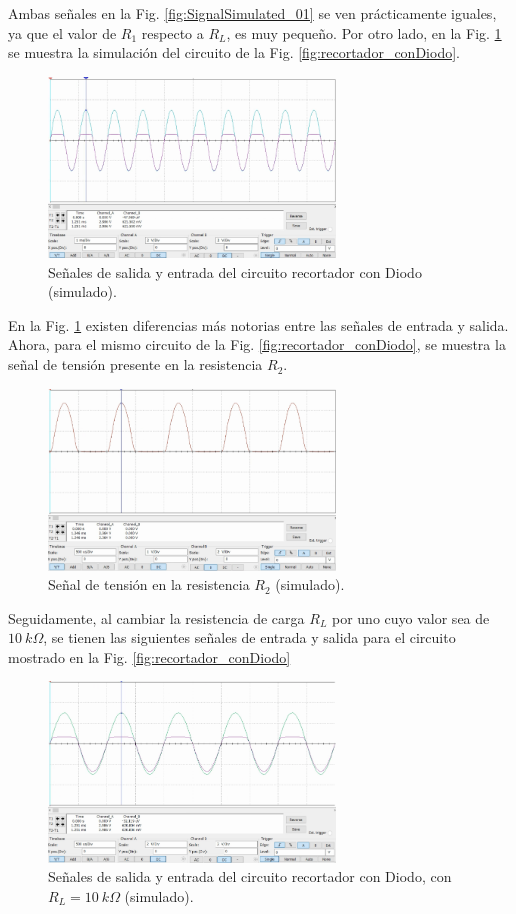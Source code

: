\documentclass[journal]{IEEEtran}
\begin{document}
Ambas señales en la Fig. \ref{fig:SignalSimulated_01} se ven prácticamente iguales, ya que el valor de $R_1$ respecto a $R_L$, es muy pequeño. Por otro lado, en la Fig. \ref{fig:SignalSimulated_02} se muestra la simulación del circuito de la Fig. \ref{fig:recortador_conDiodo}.
\begin{figure}[H]
        \centering
        \includegraphics[width=3in]{SignalSimulated_02.png}
        \caption{Señales de salida y entrada del circuito recortador con Diodo (simulado).}
        \label{fig:SignalSimulated_02}
\end{figure}

En la Fig. \ref{fig:SignalSimulated_02} existen diferencias más notorias entre las señales de entrada y salida. Ahora, para el mismo circuito de la Fig. \ref{fig:recortador_conDiodo}, se muestra la señal de tensión presente en la resistencia $R_2$.
\begin{figure}[H]
        \centering
        \includegraphics[width=3in]{SignalSimulated_03.png}
        \caption{Señal de tensión en la resistencia $R_2$ (simulado).}
        \label{fig:SignalSimulated_03}
\end{figure}

Seguidamente, al cambiar la resistencia de carga $R_L$ por uno cuyo valor sea de $10~k\Omega$, se tienen las siguientes señales de entrada y salida para el circuito mostrado en la Fig. \ref{fig:recortador_conDiodo}
\begin{figure}[H]
        \centering
        \includegraphics[width=3in]{SignalSimulated_04.png}
        \caption{Señales de salida y entrada del circuito recortador con Diodo, con $R_L=10~k\Omega$ (simulado).}
        \label{fig:SignalSimulated_04}
\end{figure}
\end{document}
